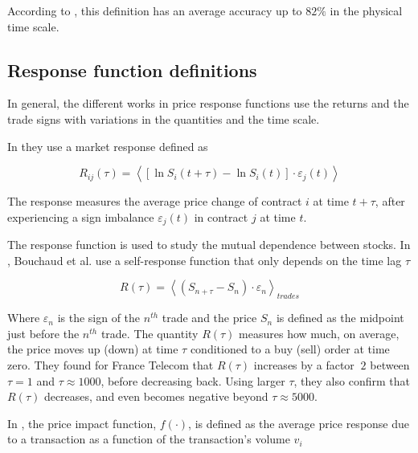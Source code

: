 According to \cite{Wang_2016_cross}, this definition has an average
accuracy up to $82\%$ in the physical time scale.


\subsection{Response function definitions}\label{subsec:response_def}

In general, the different works in price response functions use the returns and
the trade signs with variations in the quantities and the time scale.

In \cite{dissecting_cross} they use a market response defined as

\begin{equation}\label{eq:dissecting_cross}
    R_{ij}(\tau) =  \left\langle \left[ \ln S_{i}(t+\tau) - \ln S_{i}(t)
    \right] \cdot \varepsilon_{j}(t) \right\rangle
\end{equation}

The response measures the average price change of contract $i$ at time
$t+\tau$, after experiencing a sign imbalance $\varepsilon_{j}\left(t\right)$
in contract $j$ at time $t$.

The response function is used to study the mutual dependence between stocks. In
\cite{r_walks_liquidity,subtle_nature,Bouchaud_2004}, Bouchaud et al. use a
self-response function that only depends on the time lag $\tau$

\begin{equation}\label{eq:Bouchaud_2004}
    R\left(\tau\right)=\left\langle \left(S_{n+\tau}-S_{n}\right) \cdot
    \varepsilon_{n}\right\rangle_{trades}
\end{equation}

Where $\varepsilon_{n}$ is the sign of the $n^{th}$ trade and the price $S_n$
is defined as the midpoint just before the $n^{th}$ trade.
The quantity $R\left(\tau\right)$ measures how much, on average, the price
moves up (down) at time $\tau$ conditioned to a buy (sell) order at time zero.
They found for France Telecom that $R\left(\tau \right)$ increases by a factor
$~2$ between $\tau = 1$ and $\tau \approx 1000$, before decreasing back. Using
larger $\tau$, they also confirm that $R\left(\tau\right)$ decreases, and even
becomes negative beyond $\tau \approx 5000$.

In \cite{theory_market_impact}, the price impact function,
$f \left(\cdot\right)$, is defined as the average price response due to a
transaction as a function of the transaction's volume $v_{i}$

